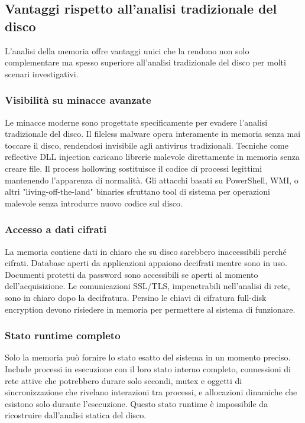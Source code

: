 \subsection{Vantaggi rispetto all'analisi tradizionale del disco}

L'analisi della memoria offre vantaggi unici che la rendono non solo complementare ma spesso superiore all'analisi tradizionale del disco per molti scenari investigativi.

\subsubsection{Visibilità su minacce avanzate}
Le minacce moderne sono progettate specificamente per evadere l'analisi tradizionale del disco. Il fileless malware opera interamente in memoria senza mai toccare il disco, rendendosi invisibile agli antivirus tradizionali. Tecniche come reflective DLL injection caricano librerie malevole direttamente in memoria senza creare file. Il process hollowing sostituisce il codice di processi legittimi mantenendo l'apparenza di normalità. Gli attacchi basati su PowerShell, WMI, o altri "living-off-the-land" binaries sfruttano tool di sistema per operazioni malevole senza introdurre nuovo codice sul disco.

\subsubsection{Accesso a dati cifrati}
La memoria contiene dati in chiaro che su disco sarebbero inaccessibili perché cifrati. Database aperti da applicazioni appaiono decifrati mentre sono in uso. Documenti protetti da password sono accessibili se aperti al momento dell'acquisizione. Le comunicazioni SSL/TLS, impenetrabili nell'analisi di rete, sono in chiaro dopo la decifratura. Persino le chiavi di cifratura full-disk encryption devono risiedere in memoria per permettere al sistema di funzionare.

\subsubsection{Stato runtime completo}
Solo la memoria può fornire lo stato esatto del sistema in un momento preciso. Include processi in esecuzione con il loro stato interno completo, connessioni di rete attive che potrebbero durare solo secondi, mutex e oggetti di sincronizzazione che rivelano interazioni tra processi, e allocazioni dinamiche che esistono solo durante l'esecuzione. Questo stato runtime è impossibile da ricostruire dall'analisi statica del disco.

